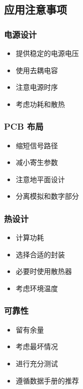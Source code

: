 \subsection{应用注意事项}

\subsubsection{电源设计}

\begin{itemize}
  \item 提供稳定的电源电压
  \item 使用去耦电容
  \item 注意电源时序
  \item 考虑功耗和散热
\end{itemize}

\subsubsection{PCB 布局}

\begin{itemize}
  \item 缩短信号路径
  \item 减小寄生参数
  \item 注意地平面设计
  \item 分离模拟和数字部分
\end{itemize}

\subsubsection{热设计}

\begin{itemize}
  \item 计算功耗
  \item 选择合适的封装
  \item 必要时使用散热器
  \item 考虑环境温度
\end{itemize}

\subsubsection{可靠性}

\begin{itemize}
  \item 留有余量
  \item 考虑最坏情况
  \item 进行充分测试
  \item 遵循数据手册的推荐
\end{itemize}

